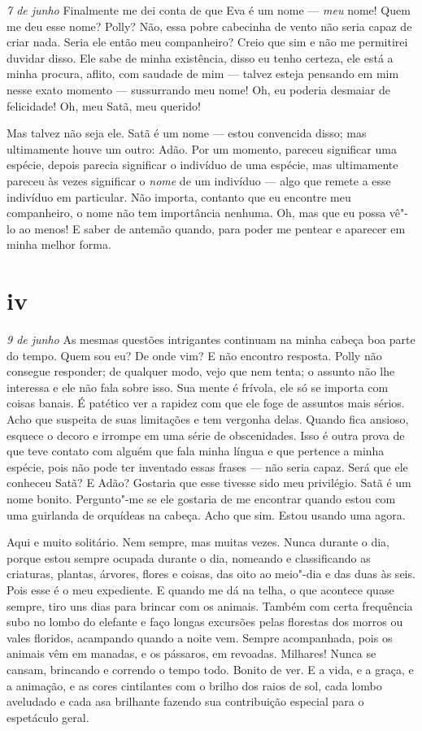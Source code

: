 \textit{7 de junho} Finalmente me dei conta de que Eva é um nome --- \textit{meu}
nome! Quem me deu esse nome? Polly? Não, essa pobre cabecinha de vento não seria
capaz de criar nada. Seria ele então meu companheiro? Creio que sim e não me
permitirei duvidar disso. Ele sabe de minha existência, disso eu tenho certeza,
ele está a minha procura, aflito, com saudade de mim --- talvez esteja pensando
em mim nesse exato momento --- sussurrando meu nome! Oh, eu poderia desmaiar de
felicidade! Oh, meu Satã, meu querido!

Mas talvez não seja ele. Satã é um nome --- estou convencida disso; mas
ultimamente houve um outro: Adão. Por um momento, pareceu significar uma
espécie, depois parecia significar o indivíduo de uma espécie, mas ultimamente
pareceu às vezes significar o \textit{nome} de um indivíduo --- algo que remete
a esse indivíduo em particular. Não importa, contanto que eu encontre meu
companheiro, o nome não tem importância nenhuma. Oh, mas que eu possa vê"-lo ao
menos! E saber de antemão quando, para poder me pentear e aparecer em minha
melhor forma.

\section{iv}


\textit{9 de junho} As mesmas questões intrigantes continuam na minha cabeça boa
parte do tempo. Quem sou eu? De onde vim? E não encontro resposta. Polly não
consegue responder; de qualquer modo, vejo que nem tenta; o assunto não
lhe interessa e ele não fala sobre isso. Sua mente é frívola, ele só se importa com
coisas banais. É patético ver a rapidez com que ele foge de assuntos mais
sérios. Acho que suspeita de suas limitações e tem vergonha delas. Quando
fica ansioso, esquece o decoro e irrompe em uma série de obscenidades. Isso é
outra prova de que teve contato com alguém que fala minha língua e que pertence a
minha espécie, pois não pode ter inventado essas frases --- não seria capaz.
Será que ele conheceu Satã? E Adão? Gostaria que esse tivesse sido
meu privilégio. Satã é um nome bonito. Pergunto"-me se ele gostaria de me
encontrar quando estou com uma guirlanda de orquídeas na cabeça. Acho que sim.
Estou usando uma agora.

Aqui e muito solitário. Nem sempre, mas muitas vezes. Nunca durante o dia, porque estou
sempre ocupada durante o dia, nomeando e classificando as criaturas, plantas,
árvores, flores e coisas, das oito ao meio"-dia e das duas às seis. Pois esse é o
meu expediente. E quando me dá na telha, o que acontece quase sempre, tiro uns
dias para brincar com os animais. Também com certa frequência subo no lombo do
elefante e faço longas excursões pelas florestas dos morros ou vales floridos,
acampando quando a noite vem. Sempre acompanhada, pois os animais vêm em
manadas, e os pássaros, em revoadas. Milhares! Nunca se cansam, brincando e
correndo o tempo todo. Bonito de ver. E a vida, e a graça, e a animação, e as
cores cintilantes com o brilho dos raios de sol, cada lombo aveludado e cada asa
brilhante fazendo sua contribuição especial para o espetáculo geral.

